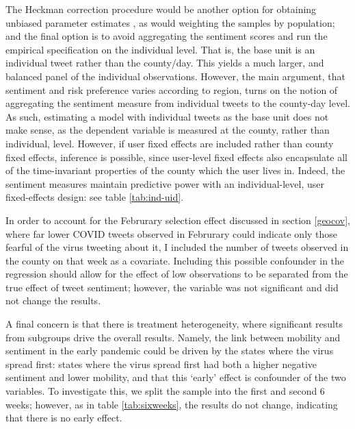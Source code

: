 \documentclass[12pt,a4]{article}
\begin{document}
The Heckman correction procedure would be another option for obtaining unbiased parameter estimates \parencite{wooldridgeSelectionCorrectionsPanel1995}, as would weighting the samples by population; and the final option is to avoid aggregating the sentiment scores and run the empirical specification on the individual level. That is, the base unit is an individual tweet rather than the county/day. This yields a much larger, and balanced panel of the individual observations. However, the main argument, that sentiment and risk preference varies according to region, turns on the notion of aggregating the sentiment measure from individual tweets to the county-day level. As such, estimating a model with individual tweets as the base unit does not make sense, as the dependent variable is measured at the county, rather than individual, level. However, if user fixed effects are included rather than county fixed effects, inference is possible, since user-level fixed effects also encapsulate all of the time-invariant properties of the county which the user lives in. Indeed, the sentiment measures maintain predictive power with an individual-level, user fixed-effects design: see table \ref{tab:ind-uid}.

In order to account for the Februrary selection effect discussed in section \ref{geocov}, where far lower COVID tweets observed in Februrary could indicate only those fearful of the virus tweeting about it, I included the number of tweets observed in the county on that week as a covariate. Including this possible confounder in the regression should allow for the effect of low observations to be separated from the true effect of tweet sentiment; however, the variable was not significant and did not change the results.

A final concern is that there is treatment heterogeneity, where significant results from subgroups drive the overall results. Namely, the link between mobility and sentiment in the early pandemic could be driven by the states where the virus spread first: states where the virus spread first had both a higher negative sentiment and lower mobility, and that this `early' effect is confounder of the two variables. To investigate this, we split the sample into the first and second 6 weeks; however, as in table \ref{tab:sixweeks}, the results do not change, indicating that there is no early effect.
\end{document}
